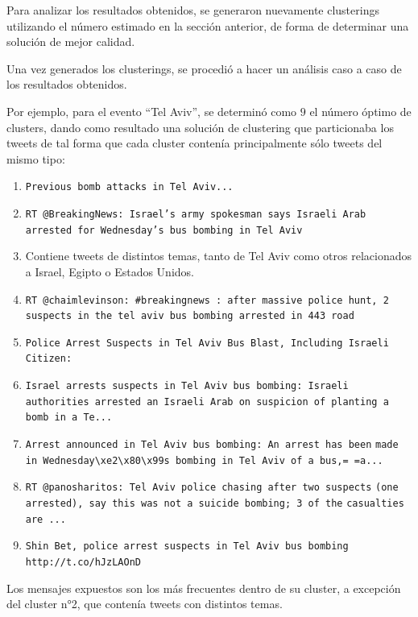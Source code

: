 \documentclass[upright, contnum]{umemoria}
\begin{document}
    Para analizar los resultados obtenidos, se generaron nuevamente
    clusterings utilizando el número estimado en la sección anterior, de
    forma de determinar una solución de mejor calidad.

    Una vez generados los clusterings, se procedió a hacer un análisis
    caso a caso de los resultados obtenidos.

    Por ejemplo, para el evento ``Tel Aviv'', se determinó como $9$ el
    número óptimo de clusters, dando como resultado una solución de
    clustering que particionaba los tweets de tal forma que cada
    cluster contenía principalmente sólo tweets del mismo tipo:

\begin{enumerate}
\item \texttt{Previous bomb attacks in Tel Aviv...}
\item \texttt{RT @BreakingNews: Israel's army spokesman says Israeli Arab        arrested for Wednesday's bus bombing in Tel Aviv}
\item Contiene tweets de distintos temas, tanto de Tel Aviv como
       otros relacionados a Israel, Egipto o Estados Unidos.
\item \texttt{RT @chaimlevinson: \#breakingnews : after massive  police hunt,        2  suspects in the tel aviv bus bombing arrested in 443 road}
\item \texttt{Police Arrest Suspects in Tel Aviv Bus Blast, Including        Israeli Citizen:}
\item \texttt{Israel arrests suspects in Tel Aviv bus bombing: Israeli}
       \texttt{authorities arrested an Israeli Arab on suspicion of planting a}
       \texttt{bomb in a Te...}
\item \texttt{Arrest announced in Tel Aviv bus bombing: An arrest has been}
       \texttt{made in Wednesday\textbackslash{}xe2\textbackslash{}x80\textbackslash{}x99s bombing in Tel Aviv of a bus,=        =a...}
\item \texttt{RT @panosharitos: Tel Aviv police chasing after two suspects}
       \texttt{(one arrested), say this was not a suicide bombing; 3 of the}
       \texttt{casualties are ...}
\item \texttt{Shin Bet, police arrest suspects in Tel Aviv bus bombing}
       \texttt{http://t.co/hJzLAOnD}
\end{enumerate}
    Los mensajes expuestos son los más frecuentes dentro de su
    cluster, a excepción del cluster n°2, que contenía tweets con
    distintos temas. 
\end{document}
